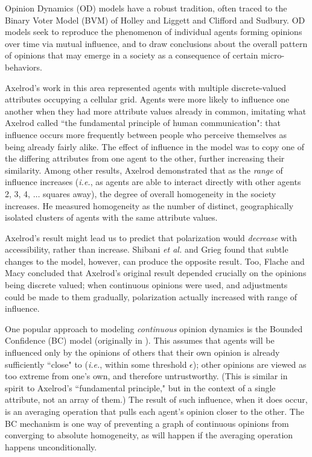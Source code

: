 
\label{sec:related}

Opinion Dynamics (OD) models have a robust tradition, often traced to the
Binary Voter Model (BVM) of Holley and Liggett\cite{holley_ergodic_1975} and
Clifford and Sudbury\cite{clifford_model_1973}. OD models seek to reproduce
the phenomenon of individual agents forming opinions over time via mutual
influence, and to draw conclusions about the overall pattern of opinions that
may emerge in a society as a consequence of certain micro-behaviors.

Axelrod's work in this area\cite{axelrod_dissemination_1997} represented
agents with multiple discrete-valued attributes occupying a cellular grid.
Agents were more likely to influence one another when they had more attribute
values already in common, imitating what Axelrod called ``the fundamental
principle of human communication": that influence occurs more frequently
between people who perceive themselves as being already fairly alike. The
effect of influence in the model was to copy one of the differing attributes
from one agent to the other, further increasing their similarity. Among other
results, Axelrod demonstrated that as the \textit{range} of influence
increases (\textit{i.e.}, as agents are able to interact directly with other
agents 2, 3, 4, $\dots$ squares away), the degree of overall homogeneity in
the society increases. He measured homogeneity as the number of distinct,
geographically isolated clusters of agents with the same attribute values.

Axelrod's result might lead us to predict that polarization would
\textit{decrease} with accessibility, rather than increase. Shibani \textit{et
al.}\cite{shibanai_effects_2001} and Grieg\cite{greig_end_2002} found that
subtle changes to the model, however, can produce the opposite result. Too,
Flache and Macy\cite{flache_why_2006} concluded that Axelrod's original result
depended crucially on the opinions being discrete valued; when continuous
opinions were used, and adjustments could be made to them gradually,
polarization actually increased with range of influence.

One popular approach to modeling \textit{continuous} opinion dynamics is the
Bounded Confidence (BC) model (originally in
\cite{deffuant_mixing_2000,hegselmann_opinion_2002}). This assumes that agents
will be influenced only by the opinions of others that their own opinion is
already sufficiently ``close" to (\textit{i.e.}, within some threshold
$\epsilon$); other opinions are viewed as too extreme from one's own, and
therefore untrustworthy. (This is similar in spirit to Axelrod's ``fundamental
principle," but in the context of a single attribute, not an array of them.)
The result of such influence, when it does occur, is an averaging operation
that pulls each agent's opinion closer to the other. The BC mechanism is one
way of preventing a graph of continuous opinions from converging to absolute
homogeneity, as will happen if the averaging operation happens
unconditionally.

